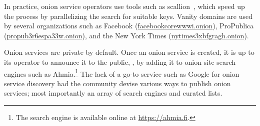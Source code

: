 In practice, onion service operators use tools such as scallion~\cite{scallion},
which speed up the process by parallelizing the search for suitable keys.
Vanity domains are used by several organizations such as Facebook
(\url{facebookcorewwwi.onion}), ProPublica (\url{propub3r6espa33w.onion}), and
the New York Times (\url{nytimes3xbfgragh.onion}).

Onion services are private by default.  Once an onion service is created, it is
up to its operator to announce it to the public, \eg, by adding it to onion site
search engines such as Ahmia.\footnote{The search engine is available online at
\url{https://ahmia.fi}.}  The lack of a go-to service such as Google for onion
service discovery had the community devise various ways to publish onion
services; most importantly an array of search engines and curated lists.
